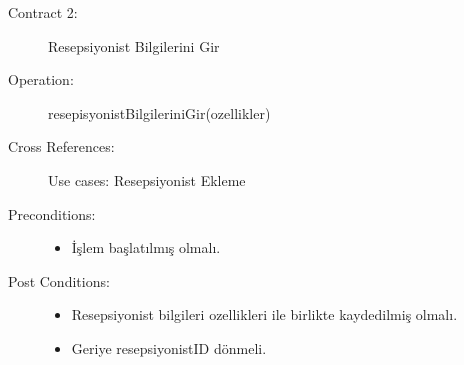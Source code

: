 \documentclass[12pt,a4paper]{report}
\begin{document}
\begin{description}
\item[Contract 2:] Resepsiyonist Bilgilerini Gir
\item[Operation:] resepisyonistBilgileriniGir(ozellikler)
\item[Cross References:] Use cases: Resepsiyonist Ekleme
\item[Preconditions:] \hspace{10 mm}
\begin{itemize}
\item İşlem başlatılmış olmalı.
\end{itemize}
\item[Post Conditions:] \hspace{10 mm}
\begin{itemize} 
\item Resepsiyonist bilgileri ozellikleri ile birlikte kaydedilmiş olmalı.
\item Geriye resepsiyonistID dönmeli. \\
\end{itemize}
\end{description}
\end{document}
